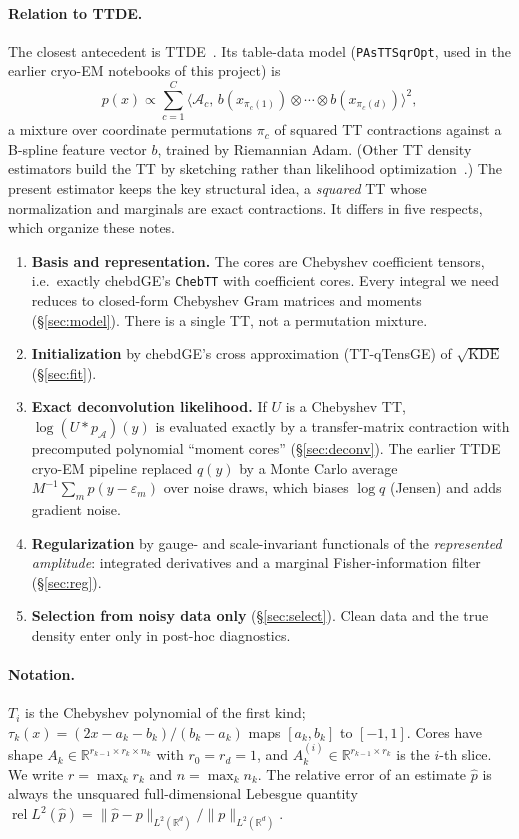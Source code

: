 \documentclass[11pt]{article}
\theoremstyle{definition}
\theoremstyle{remark}
\newcommand{\R}{\mathbb{R}}
\newcommand{\ip}[2]{\langle #1,#2\rangle}
\newcommand{\norm}[1]{\lVert #1\rVert}
\newcommand{\relLtwo}{\operatorname{rel}L^2}
\begin{document}
\paragraph{Relation to TTDE.}
The closest antecedent is TTDE~\cite{novikov2021ttde}. Its table-data model (\texttt{PAsTTSqrOpt}, used in the
earlier cryo-EM notebooks of this project) is
\begin{equation}\label{eq:ttde}
  p(x)\propto \sum_{c=1}^{C}\ip{\mathcal A_c}{\,b(x_{\pi_c(1)})\otimes\cdots\otimes b(x_{\pi_c(d)})}^2,
\end{equation}
a mixture over coordinate permutations $\pi_c$ of squared TT contractions against a B-spline feature vector $b$,
trained by Riemannian Adam. (Other TT density estimators build the TT by sketching rather than likelihood optimization~\cite{hur2023generative,peng2024vrs}.) The present estimator keeps the key structural idea, a \emph{squared} TT whose
normalization and marginals are exact contractions. It differs in five respects, which organize these notes.
\begin{enumerate}[leftmargin=2em,itemsep=1pt]
  \item \textbf{Basis and representation.} The cores are Chebyshev coefficient tensors, i.e.\ exactly chebdGE's
  \texttt{ChebTT} with coefficient cores. Every integral we need reduces to closed-form Chebyshev Gram
  matrices and moments (\S\ref{sec:model}). There is a single TT, not a permutation mixture.
  \item \textbf{Initialization} by chebdGE's cross approximation (TT-qTensGE) of $\sqrt{\text{KDE}}$ (\S\ref{sec:fit}).
  \item \textbf{Exact deconvolution likelihood.} If $U$ is a Chebyshev TT, $\log(U*p_{\mathcal A})(y)$ is evaluated exactly
  by a transfer-matrix contraction with precomputed polynomial ``moment cores'' (\S\ref{sec:deconv}). The earlier
  TTDE cryo-EM pipeline replaced $q(y)$ by a Monte Carlo average $M^{-1}\sum_m p(y-\varepsilon_m)$ over noise draws,
  which biases $\log q$ (Jensen) and adds gradient noise.
  \item \textbf{Regularization} by gauge- and scale-invariant functionals of the \emph{represented amplitude}:
  integrated derivatives and a marginal Fisher-information filter (\S\ref{sec:reg}).
  \item \textbf{Selection from noisy data only} (\S\ref{sec:select}). Clean data and the true density enter only in
  post-hoc diagnostics.
\end{enumerate}

\paragraph{Notation.} $T_i$ is the Chebyshev polynomial of the first kind; $\tau_k(x)=(2x-a_k-b_k)/(b_k-a_k)$ maps
$[a_k,b_k]$ to $[-1,1]$. Cores have shape $A_k\in\R^{r_{k-1}\times r_k\times n_k}$ with $r_0=r_d=1$, and
$A_k^{(i)}\in\R^{r_{k-1}\times r_k}$ is the $i$-th slice. We write $r=\max_k r_k$ and $n=\max_k n_k$. The relative error
of an estimate $\hat p$ is always the unsquared full-dimensional Lebesgue quantity
$\relLtwo(\hat p)=\norm{\hat p-p}_{L^2(\R^d)}/\norm{p}_{L^2(\R^d)}$.
\end{document}
